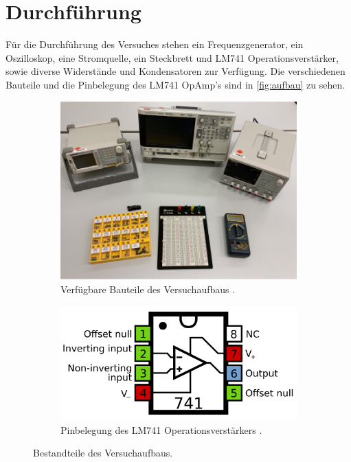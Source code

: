 \section{Durchführung}
\label{sec:Durchführung}
Für die Durchführung des Versuches stehen ein Frequenzgenerator, ein Oszilloskop, eine Stromquelle, ein Steckbrett und LM741 Operationsverstärker, sowie diverse Widerstände 
und Kondensatoren zur Verfügung.
Die verschiedenen Bauteile und die Pinbelegung des LM741 OpAmp's sind in \autoref{fig:aufbau} zu sehen.
\begin{figure}
    \centering
    \begin{subfigure}{.4\textwidth}
        \includegraphics[width=\textwidth]{"content/pics/setup.png"}
        \caption{Verfügbare Bauteile des Versuchaufbaus \cite{v51}.}
        \label{fig:aufbau1}
    \end{subfigure}
    \hfill
    \begin{subfigure}{.4\textwidth}
        \includegraphics[width=\textwidth]{"content/pics/LM741.png"}
        \caption{Pinbelegung des LM741 Operationsverstärkers \cite{LM741}.}
        \label{fig:generator2}
    \end{subfigure}
    \caption{Bestandteile des Versuchaufbaus.}
    \label{fig:aufbau}
\end{figure}

